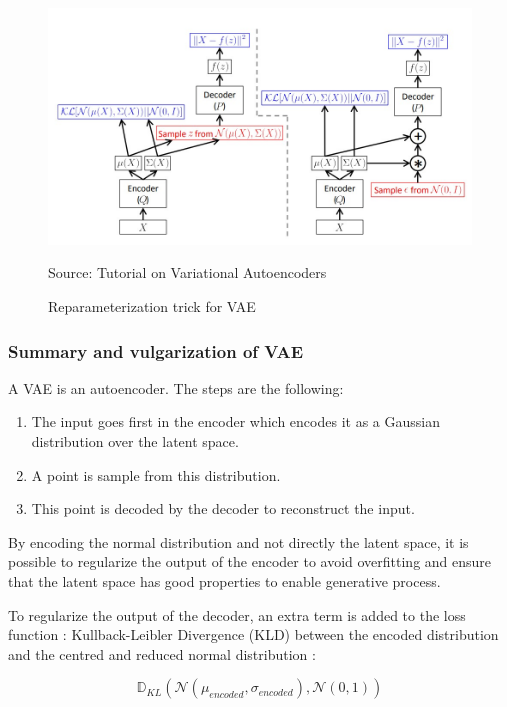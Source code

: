 \documentclass[12pt]{report}
\begin{document}
\begin{figure}[htbp]
    \centering
    \includegraphics[width=\textwidth]{images/nn/architectures/reparameterization-trick.jpg}
    \caption{Reparameterization trick for VAE}
    Source: Tutorial on Variational Autoencoders \cite{doersch_tutorial_2016}
    \label{fig:vae:reparameterization-trick}
\end{figure}

\subsubsection{Summary and vulgarization of VAE}

A VAE  is an autoencoder. The steps are the following:
\begin{enumerate}
    \item The input goes first in the encoder which encodes it as a Gaussian distribution over the latent space.
    \item A point is sample from this distribution.
    \item This point is decoded by the decoder to reconstruct the input.
\end{enumerate}

By encoding the normal distribution and not directly the latent space, it is possible to regularize the output of the encoder to avoid overfitting and ensure that the latent space has good properties to enable generative process.

To regularize the output of the decoder, an extra term is added to the loss function : Kullback-Leibler Divergence (KLD) between the encoded distribution and the centred and reduced normal distribution :

\begin{equation}
    \mathbb{D}_{KL} (\mathcal{N}(\mu_{encoded}, \sigma_{encoded}), \mathcal{N}(0, 1))
\end{equation}
\end{document}
